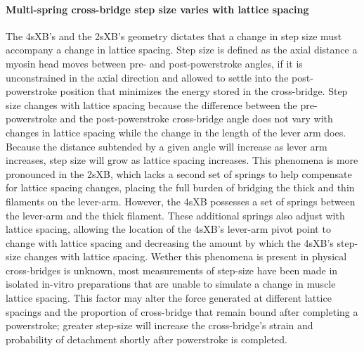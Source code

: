 \documentclass[]{article}
\begin{document}
\paragraph{Multi-spring cross-bridge step size varies with lattice spacing} %
The 4sXB's and the 2sXB's geometry dictates that a change in step size must accompany a change in lattice spacing. 
Step size is defined as the axial distance a myosin head moves between pre- and post-powerstroke angles, if it is unconstrained in the axial direction and allowed to settle into the post-powerstroke position that minimizes the energy stored in the cross-bridge.
Step size changes with lattice spacing because the difference between the pre-powerstroke and the post-powerstroke cross-bridge angle does not vary with changes in lattice spacing while the change in the length of the lever arm does. 
Because the distance subtended by a given angle will increase as lever arm increases, step size will grow as lattice spacing increases. 
This phenomena is more pronounced in the 2sXB, which lacks a second set of springs to help compensate for lattice spacing changes, placing the full burden of bridging the thick and thin filaments on the lever-arm. 
However, the 4sXB possesses a set of springs between the lever-arm and the thick filament.
These additional springs also adjust with lattice spacing, allowing the location of the 4sXB's lever-arm pivot point to change with lattice spacing and decreasing the amount by which the 4sXB's step-size changes with lattice spacing.  
Wether this phenomena is present in physical cross-bridges is unknown, most measurements of step-size have been made in isolated in-vitro preparations that are unable to simulate a change in muscle lattice spacing. %
This factor may alter the force generated at different lattice spacings and the proportion of cross-bridge that remain bound after completing a powerstroke; greater step-size will increase the cross-bridge's strain and probability of detachment shortly after powerstroke is completed. 

\end{document}
